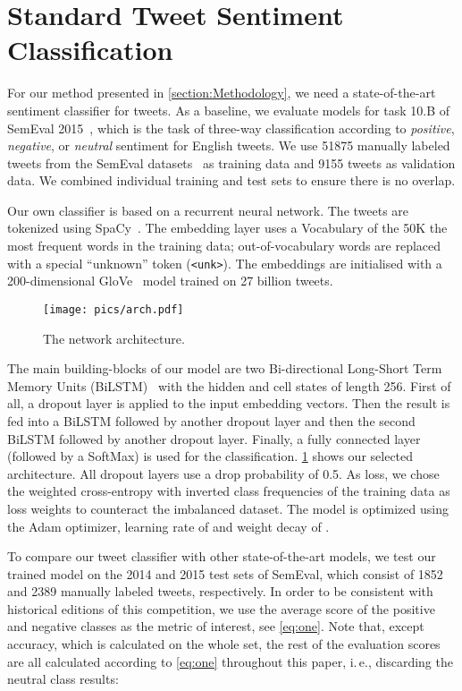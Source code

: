 \documentclass[conference]{IEEEtran}
\newcommand{\ie}{i.\,e.,\xspace}
\begin{document}
\section{Standard Tweet Sentiment Classification}
\label{section:tweet}

For our method presented in \cref{section:Methodology}, we need a state-of-the-art sentiment classifier for tweets. As a baseline, we evaluate models for task 10.B of SemEval 2015~\cite{rosenthal2019semeval2015}, which is the task of three-way classification according to \emph{positive}, \emph{negative}, or \emph{neutral} sentiment for English tweets. We use \num{51875} manually labeled tweets from the SemEval datasets~\cite{nakov-etal-2013-semeval,rosenthal2019semeval2014,rosenthal2019semeval2015,nakov-etal-2016-semeval,rosenthal-etal-2017-semeval} as training data and \num{9155} tweets as validation data.
We combined individual training and test sets to ensure there is no overlap.

Our own classifier is based on a recurrent neural network. The tweets are tokenized using SpaCy~\cite{honnibal-johnson-2015-improved}. The embedding layer uses a Vocabulary of the 50K the most frequent words in the training data; out-of-vocabulary words are replaced with a special ``unknown'' token (\texttt{<unk>}). The embeddings are initialised with a 200-dimensional GloVe~\cite{Pennington14glove:global} model trained on 27 billion tweets.

\begin{figure}[t]
    \centering
        \texttt{[image: pics/arch.pdf]}
    \caption{The network architecture.}
    \label{fig:architecture}
\end{figure}
The main building-blocks of our model are two Bi-directional Long-Short Term Memory Units (BiLSTM)~\cite{hochreiter1997long} with the hidden and cell states of length 256. First of all, a dropout layer is applied to the input embedding vectors. Then the result is fed into a BiLSTM followed by another dropout layer and then the second BiLSTM followed by another dropout layer. Finally, a fully connected layer (followed by a SoftMax) is used for the classification.
\cref{fig:architecture} shows our selected architecture. 
All dropout layers use a drop probability of 0.5.
As loss, we chose the weighted cross-entropy with inverted class frequencies of the training data as loss weights to counteract the imbalanced dataset. The model is optimized using the Adam optimizer, learning rate of  and weight decay of .

To compare our tweet classifier with other state-of-the-art models, we test our trained model on the 2014 and 2015 test sets of SemEval, which consist of \num{1852} and \num{2389} manually labeled tweets, respectively. In order to be consistent with historical editions of this competition, we use the average  score of the positive and negative classes as the metric of interest, see \cref{eq:one}. Note that, except accuracy, which is calculated on the whole set, the rest of the evaluation scores are all calculated according to \cref{eq:one} throughout this paper, \ie discarding the neutral class results:
\end{document}
